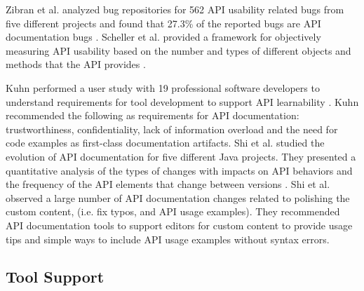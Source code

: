 \documentclass[11pt,oneside]{book}
\begin{document}
Zibran et al. analyzed bug repositories  for 562 API usability related bugs from five different projects and found that 27.3\% of the reported bugs are API documentation bugs \cite{zibran2011useful}. Scheller et al. provided a framework for objectively measuring API usability based on the number and types of different objects and methods that the API provides \cite{scheller2015automated}.

Kuhn performed a user study with 19 professional software developers to understand requirements for tool development to support API learnability \cite{Kuhn_on_designing}. Kuhn recommended the following as requirements for API documentation: trustworthiness, confidentiality, lack of information overload and the need for code examples as first-class documentation artifacts. Shi et al. studied the evolution of API documentation for five different Java projects. They presented a quantitative analysis of the types of changes with impacts on API behaviors and the frequency of the API elements that change between versions \cite{shi2011empirical}. Shi et al. observed a large number of API documentation changes related to polishing the custom content, (i.e. fix typos, and API usage examples). They recommended API documentation tools to support editors for custom content to provide usage tips and simple ways to include API usage examples without syntax errors.

\subsection{Tool Support} %
\label{ssub:tool_support}

\end{document}

